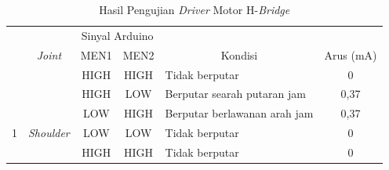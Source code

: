 \begin{longtable}{|c|l|c|c|l|c|}
	\caption{Hasil Pengujian \textit{Driver} Motor H-\textit{Bridge}}
	\label{tbl.drivermotor1}\\
	\hline
	\rowcolor[HTML]{656565} 
	\cellcolor[HTML]{656565}                     & \multicolumn{1}{c|}{\cellcolor[HTML]{656565}}                        & \multicolumn{2}{c|}{\cellcolor[HTML]{656565}Sinyal Arduino} & \multicolumn{1}{c|}{\cellcolor[HTML]{656565}}                          & \cellcolor[HTML]{656565}                            \\ \cline{3-4}
	\rowcolor[HTML]{656565} 
	\multirow{-2}{*}{\cellcolor[HTML]{656565}No} & \multicolumn{1}{c|}{\multirow{-2}{*}{\cellcolor[HTML]{656565}\textit{Joint}}} & MEN1                         & MEN2                         & \multicolumn{1}{c|}{\multirow{-2}{*}{\cellcolor[HTML]{656565}Kondisi}} & \multirow{-2}{*}{\cellcolor[HTML]{656565}Arus (mA)} \\ \hline
	\endfirsthead
	\endhead
	&                                                                      & HIGH                         & HIGH                         & Tidak berputar                                                         & 0                                                   \\ \cline{3-6} 
	&                                                                      & HIGH                         & LOW                          & Berputar searah putaran jam                                            & 0,37                                                \\ \cline{3-6} 
	&                                                                      & LOW                          & HIGH                         & Berputar berlawanan arah jam                                           & 0,37                                                \\ \cline{3-6} 
	\multirow{-4}{*}{1}                          & \multirow{-4}{*}{\textit{Shoulder}}                                           & LOW                          & LOW                          & Tidak berputar                                                         & 0                                                   \\ \hline
	&                                                                      & HIGH                         & HIGH                         & Tidak berputar                                                         & 0                                                   \\ \cline{3-6} 

\end{longtable}
